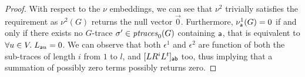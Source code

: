 \addedForOurPropos*
\begin{proof}
	{With respect to the $\nu$ embeddings, we can see that $\nu^2$ trivially satisfies the requirement as $\nu^2(G)$ returns the null vector $\vec{0}$. Furthermore, $\nu^1_\const{a}(G)=0$ if and only if there exists no $G$-trace  $\nonlogtrace\in\ptraces{G}{0}$ containing $\const{a}$, that is equivalent to  $\forall u\in V.\;L_{\const{a}u}=0$. We can observe that both $\epsilon^1$ and $\epsilon^2$ are function of both the sub-traces of length $i$ from $1$ to $l$, and  $[LR^iL^t]_\const{ab}$ too, thus implying that a summation of possibly zero terms possibly returns zero.}
\end{proof}
